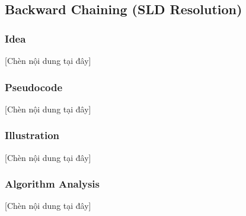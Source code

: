 \subsection{Backward Chaining (SLD Resolution)}
\subsubsection{Idea}
[Chèn nội dung tại đây]

\subsubsection{Pseudocode}
[Chèn nội dung tại đây]

\subsubsection{Illustration}
[Chèn nội dung tại đây]

\subsubsection{Algorithm Analysis}
[Chèn nội dung tại đây]